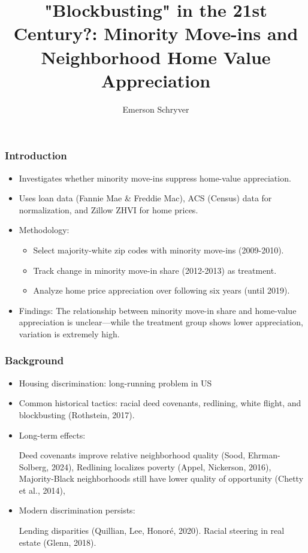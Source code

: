 \documentclass[aspectratio=169]{beamer}
\title[Minority Move-Ins and Home Appreciation]{"Blockbusting" in the 21st Century?: Minority Move-ins and Neighborhood Home Value Appreciation}
\author{Emerson Schryver}
\begin{document}
\begin{frame}
    \maketitle
\end{frame}
\begin{frame}
\frametitle{Introduction}
\begin{itemize}
    \item Investigates whether minority move-ins suppress home-value appreciation.
    \item Uses loan data (Fannie Mae \& Freddie Mac), ACS (Census) data for normalization, and Zillow ZHVI for home prices.
    \item Methodology:
    \begin{itemize}
        \item Select majority-white zip codes with minority move-ins (2009-2010).
        \item Track change in minority move-in share (2012-2013) as treatment.
        \item Analyze home price appreciation over following six years (until 2019).
    \end{itemize}
    \item Findings: The relationship between minority move-in share and home-value appreciation is unclear—while the treatment group shows lower appreciation, variation is extremely high.
\end{itemize}
\end{frame}
\begin{frame}
    \frametitle{Background}
    \begin{itemize}
        \item Housing discrimination: long-running problem in US
        \item Common historical tactics: racial deed covenants, redlining, white flight, and blockbusting (Rothstein, 2017).
        \item Long-term effects:
        
        \small
        Deed covenants improve relative neighborhood quality (Sood, Ehrman-Solberg, 2024), 
        Redlining localizes poverty (Appel, Nickerson, 2016),
        Majority-Black neighborhoods still have lower quality of opportunity (Chetty et al., 2014),
    
        \normalsize
        \item Modern discrimination persists:
        
        \small
        Lending disparities (Quillian, Lee, Honoré, 2020).
        Racial steering in real estate (Glenn, 2018).
        
    \end{itemize}
\end{frame}
\end{document}
